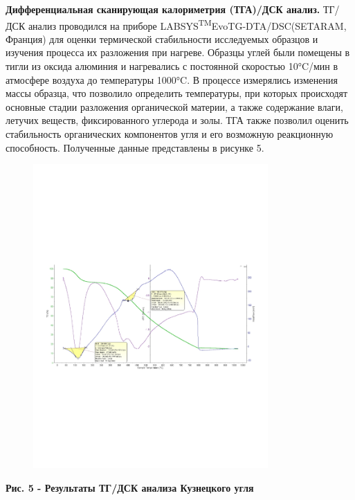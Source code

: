 {\bfseries Дифференциальная сканирующая калориметрия (ТГА)/ДСК анализ.}
ТГ/ДСК анализ проводился на приборе
LABSYS\textsuperscript{TM}EvoTG-DTA/DSC(SETARAM, Франция) для оценки
термической стабильности исследуемых образцов и изучения процесса их
разложения при нагреве. Образцы углей были помещены в тигли из оксида
алюминия и нагревались с постоянной скоростью 10°C/мин в атмосфере
воздуха до температуры 1000°C. В процессе измерялись изменения массы
образца, что позволило определить температуры, при которых происходят
основные стадии разложения органической материи, а также содержание
влаги, летучих веществ, фиксированного углерода и золы. ТГА также
позволил оценить стабильность органических компонентов угля и его
возможную реакционную способность. Полученные данные представлены в
рисунке 5.

\begin{figure}[H]
	\centering
	\includegraphics[width=0.8\textwidth]{media/gorn3/image13}
	\caption*{}
\end{figure}


{\bfseries Рис. 5 - Результаты ТГ/ДСК анализа Кузнецкого угля}

